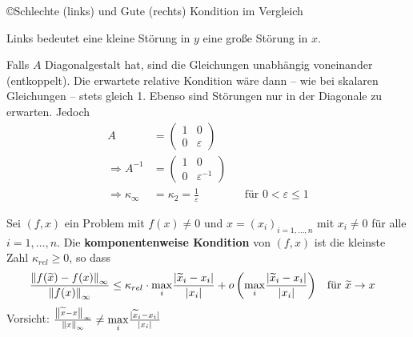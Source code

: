 \begin{Bspe}
\begin{image}{\copyright Schlechte (links) und Gute (rechts)
      Kondition im Vergleich}
    Links bedeutet eine kleine Störung in $y$ eine große Störung in $x$.
  \end{image}
\end{Bspe}



\begin{Bspe}
  Falls $A$ Diagonalgestalt hat, sind die Gleichungen 
  unabhängig voneinander (entkoppelt).
  Die erwartete relative Kondition wäre dann 
  – wie bei skalaren Gleichungen – stets gleich 1.
  Ebenso sind Störungen nur in der Diagonale zu erwarten. Jedoch
  \begin{align*}
    A  &=\begin{pmatrix}
      1 & 0\\
      0 & \varepsilon
    \end{pmatrix} \\
    \Rightarrow 	A^{-1}&=\begin{pmatrix}
      1 & 0\\
      0 & \varepsilon^{-1}
    \end{pmatrix}\\
    \Rightarrow \kappa_\infty& = \kappa_2 = \frac{1}{\varepsilon} 
        && \text{für }0 < \varepsilon \leq 1
  \end{align*}
\end{Bspe}

\begin{Defe}
  Sei $(f, x) $ ein Problem mit $f(x)\neq 0$ 
  und $x=(x_i)_{i=1,\dotsc , n}$ mit $x_i\neq 0 $  für alle $i=1,\dotsc, n$.
  Die \textbf{komponentenweise Kondition} von $(f,x)$
  ist die kleinste Zahl $\kappa_{rel}\geq 0$, so dass
  \begin{align*}
    \frac{\nn[f(\widetilde{x})-f(x)]_\infty}{\nn[f(x)]_\infty} 
    &\leq \kappa_{rel} 
      \cdot \underset{i}{\max}
      \frac{|\widetilde{x}_i-x_i|}{|x_i|}
      + o\left(\underset{i}{\max}\frac{|\widetilde{x}_i-x_i|}{|x_i|}\right) 
    && \text{für }\widetilde{x}\to x
  \end{align*}
  Vorsicht:
$
    \frac{\nn[\widetilde{x}-x]_\infty}{\nn[x]_\infty}
    \neq \underset{i}{\max}\frac{|\widetilde{x}_i-x_i|}{|x_i|}
$
\end{Defe}

